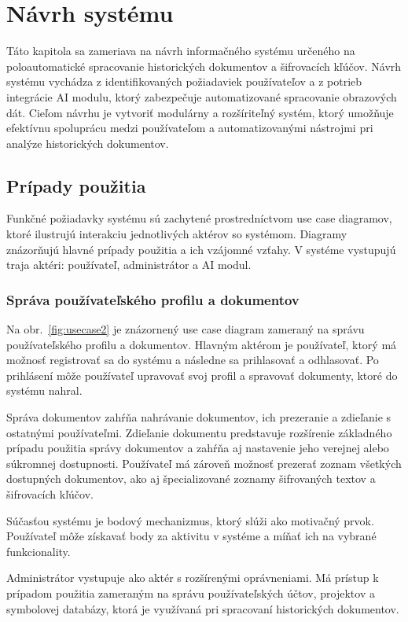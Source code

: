 \section{Návrh systému}

Táto kapitola sa zameriava na návrh informačného systému určeného na poloautomatické spracovanie historických dokumentov a šifrovacích kľúčov. Návrh systému vychádza z identifikovaných požiadaviek používateľov a z potrieb integrácie AI modulu, ktorý zabezpečuje automatizované spracovanie obrazových dát. Cieľom návrhu je vytvoriť modulárny a rozšíriteľný systém, ktorý umožňuje efektívnu spoluprácu medzi používateľom a automatizovanými nástrojmi pri analýze historických dokumentov.

\subsection{Prípady použitia}

Funkčné požiadavky systému sú zachytené prostredníctvom use case diagramov, ktoré ilustrujú interakciu jednotlivých aktérov so systémom. Diagramy znázorňujú hlavné prípady použitia a ich vzájomné vzťahy. V systéme vystupujú traja aktéri: používateľ, administrátor a AI modul.

\subsubsection{Správa používateľského profilu a dokumentov}

Na obr.~\ref{fig:usecase2} je znázornený use case diagram zameraný na správu používateľského profilu a dokumentov. Hlavným aktérom je používateľ, ktorý má možnosť registrovať sa do systému a následne sa prihlasovať a odhlasovať. Po prihlásení môže používateľ upravovať svoj profil a spravovať dokumenty, ktoré do systému nahral.

Správa dokumentov zahŕňa nahrávanie dokumentov, ich prezeranie a zdieľanie s ostatnými používateľmi. Zdieľanie dokumentu predstavuje rozšírenie základného prípadu použitia správy dokumentov a zahŕňa aj nastavenie jeho verejnej alebo súkromnej dostupnosti. Používateľ má zároveň možnosť prezerať zoznam všetkých dostupných dokumentov, ako aj špecializované zoznamy šifrovaných textov a šifrovacích kľúčov.

Súčasťou systému je bodový mechanizmus, ktorý slúži ako motivačný prvok. Používateľ môže získavať body za aktivitu v systéme a míňať ich na vybrané funkcionality.

Administrátor vystupuje ako aktér s rozšírenými oprávneniami. Má prístup k prípadom použitia zameraným na správu používateľských účtov, projektov a symbolovej databázy, ktorá je využívaná pri spracovaní historických dokumentov.

